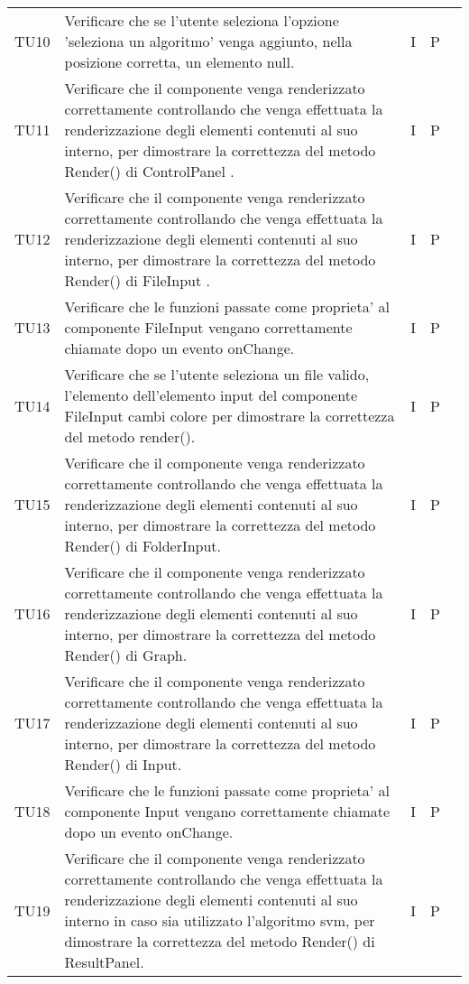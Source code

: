 \begin{longtable} {
		>{}p{15mm} 
		>{}p{79.5mm}
		>{}p{15mm} 
		>{}p{15mm}
		>{}p{0mm}}
	TU10		& Verificare che se l'utente seleziona l'opzione 'seleziona un algoritmo' venga aggiunto, nella posizione corretta, un elemento null.& I & P &\TBstrut \\ [2mm]
	TU11		& Verificare che il componente venga renderizzato correttamente controllando che venga effettuata la renderizzazione degli elementi contenuti al suo interno, per dimostrare la correttezza del metodo Render() di  ControlPanel .& I & P &\TBstrut \\ [2mm]
	TU12		& Verificare che il componente venga renderizzato correttamente controllando che venga effettuata la renderizzazione degli elementi contenuti al suo interno, per dimostrare la correttezza del metodo Render() di FileInput .& I & P &\TBstrut \\ [2mm]
	TU13		& Verificare che le funzioni passate come proprieta' al componente FileInput vengano correttamente chiamate dopo un evento onChange.& I & P &\TBstrut \\ [2mm]
	TU14		& Verificare che se l'utente seleziona un file valido, l'elemento dell'elemento input del componente FileInput cambi colore per dimostrare la correttezza del metodo render().& I & P &\TBstrut \\ [2mm]
	TU15		& Verificare che il componente venga renderizzato correttamente controllando che venga effettuata la renderizzazione degli elementi contenuti al suo interno, per dimostrare la correttezza del metodo Render() di  FolderInput.& I & P &\TBstrut \\ [2mm]
	TU16		& Verificare che il componente venga renderizzato correttamente controllando che venga effettuata la renderizzazione degli elementi contenuti al suo interno, per dimostrare la correttezza del metodo Render() di  Graph.& I & P &\TBstrut \\ [2mm]
	TU17		& Verificare che il componente venga renderizzato correttamente controllando che venga effettuata la renderizzazione degli elementi contenuti al suo interno, per dimostrare la correttezza del metodo Render() di  Input.& I & P &\TBstrut \\ [2mm]
	TU18		& Verificare che le funzioni passate come proprieta' al componente Input vengano correttamente chiamate dopo un evento onChange.& I & P &\TBstrut \\ [2mm]
	TU19		& Verificare che il componente venga renderizzato correttamente controllando che venga effettuata la renderizzazione degli elementi contenuti al suo interno in caso sia utilizzato l'algoritmo svm, per dimostrare la correttezza del metodo Render() di ResultPanel. & I & P &\TBstrut \\ [2mm]

\end{longtable}

